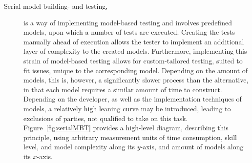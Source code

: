 \begin{description}
  \item[Serial model building- and testing,]
  is a way of implementing model-based testing and involves predefined models, upon which a number of tests are executed. Creating the tests manually ahead of execution allows the tester to implement an additional layer of complexity to the created models. Furthermore, implementing this strain of model-based testing allows for custom-tailored testing, suited to fit issues, unique to the corresponding model. Depending on the amount of models, this is, however, a significantly slower process than the alternative, in that each model requires a similar amount of time to construct. Depending on the developer, as well as the implementation techniques of models, a relatively high leaning curve may be introduced, leading to exclusions of parties, not qualified to take on this task. 
  Figure~\ref{fig:serialMBT} provides a high-level diagram, describing this principle, using arbitrary measurement units of time consumption, skill level, and model complexity along its $y$-axis, and amount of models along its $x$-axis. \newpage
  \begin{figure}[h]
    \centering
\end{figure}
\end{description}
